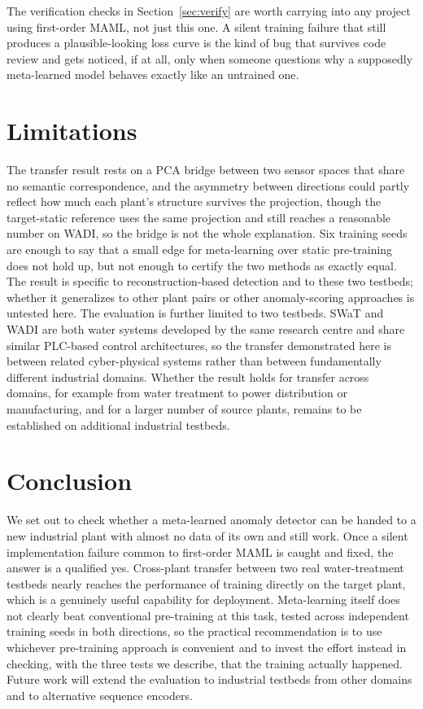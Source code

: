 \documentclass[conference]{IEEEtran}
\begin{document}
The verification checks in Section~\ref{sec:verify} are worth carrying into
any project using first-order MAML, not just this one. A silent training
failure that still produces a plausible-looking loss curve is the kind of
bug that survives code review and gets noticed, if at all, only when someone
questions why a supposedly meta-learned model behaves exactly like an
untrained one.

\section{Limitations}

The transfer result rests on a PCA bridge between two sensor spaces that
share no semantic correspondence, and the asymmetry between directions could
partly reflect how much each plant's structure survives the projection,
though the target-static reference uses the same projection and still
reaches a reasonable number on WADI, so the bridge is not the whole
explanation. Six training seeds are enough to say that a small edge for
meta-learning over static pre-training does not hold up, but not enough to
certify the two methods as exactly equal. The result is specific to
reconstruction-based detection and to these two testbeds; whether it
generalizes to other plant pairs or other anomaly-scoring approaches is
untested here.
The evaluation is further limited to two testbeds. SWaT and WADI are both
water systems developed by the same research centre and share similar
PLC-based control architectures, so the transfer demonstrated here is
between related cyber-physical systems rather than between fundamentally
different industrial domains. Whether the result holds for transfer across
domains, for example from water treatment to power distribution or
manufacturing, and for a larger number of source plants, remains to be
established on additional industrial testbeds.

\section{Conclusion}

We set out to check whether a meta-learned anomaly detector can be handed to
a new industrial plant with almost no data of its own and still work. Once a
silent implementation failure common to first-order MAML is caught and
fixed, the answer is a qualified yes. Cross-plant transfer between two real
water-treatment testbeds nearly reaches the performance of training directly
on the target plant, which is a genuinely useful capability for deployment.
Meta-learning itself does not clearly beat conventional pre-training at this
task, tested across independent training seeds in both directions, so the
practical recommendation is to use whichever pre-training approach is
convenient and to invest the effort instead in checking, with the three
tests we describe, that the training actually happened.
Future work will extend the evaluation to industrial testbeds from other
domains and to alternative sequence encoders.
\end{document}
